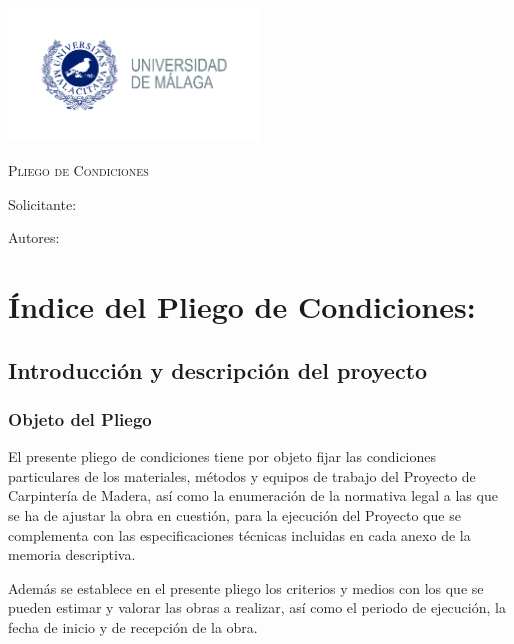 \documentclass[../main.tex]{subfiles}
\begin{document}
\newpage
\thispagestyle{empty}
\begin{center}
    {\includegraphics[width=0.5\textwidth]{Imagenes/Logo UMA.jpg}\par}
    \vspace{1cm}
    {\bfseries\LARGE \Facultad \par}
    \vspace{0.5cm}
    {\scshape\Large \Grado \par}
    \vspace{3cm}
    {\scshape\Huge Pliego de Condiciones \par}
    \vspace{1.5cm}
    {\itshape\Large \TituloProyecto \par}
    \vfill
    {\Large Solicitante: \par}
    {\Large \Solicitante  \par}
    \vspace{1cm}
    {\Large Autores: \par}
    {\Large \Autora \par}
    {\Large \Autor \par}
    \vfill
    {\Large \Fecha \par}
\end{center}

\chapter*{Índice del Pliego de Condiciones:}
\newpage
{}

\section{Introducción y descripción del proyecto}
\subsection{Objeto del Pliego}
El presente pliego de condiciones tiene por objeto fijar las condiciones particulares de los materiales, métodos y equipos de trabajo del Proyecto de Carpintería de Madera, así como la enumeración de la normativa legal a las que se ha de ajustar la obra en cuestión, para la ejecución del Proyecto que se complementa con las especificaciones técnicas incluidas en cada anexo de la memoria descriptiva. \par
\vspace{0.5 cm}
Además se establece en el presente pliego los criterios y medios con los que se pueden estimar y valorar las obras a realizar, así como el periodo de ejecución, la fecha de inicio y de recepción de la obra.
\end{document}

